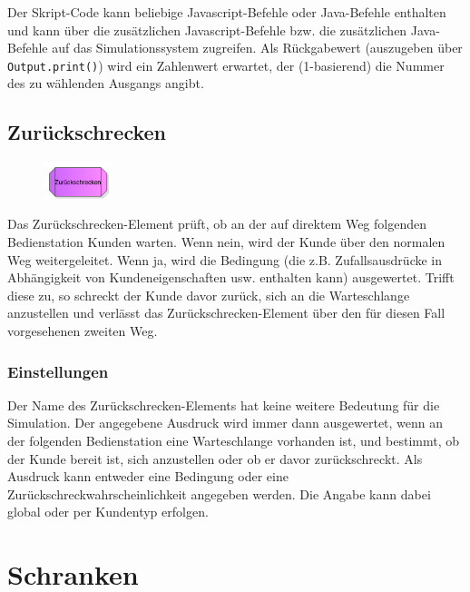 Der Skript-Code kann beliebige Javascript-Befehle oder Java-Befehle enthalten
und kann über die zusätzlichen Javascript-Befehle bzw.
die zusätzlichen Java-Befehle auf das Simulationssystem
zugreifen. Als Rückgabewert (auszugeben über \texttt{Output.print()}) wird ein Zahlenwert
erwartet, der (1-basierend) die Nummer des zu wählenden Ausgangs angibt.


\section{Zurückschrecken}
\label{ref:ModelElementBalking}

\begin{figure}
\vspace{-22pt}
\includegraphics[width=2cm]{imageModelElementBalking.png}
\vspace{-22pt}
\end{figure}

Das Zurückschrecken-Element prüft, ob an der auf direktem Weg folgenden Bedienstation Kunden warten.
Wenn nein, wird der Kunde über den normalen Weg weitergeleitet.
Wenn ja, wird die Bedingung (die z.B. Zufallsausdrücke in Abhängigkeit von Kundeneigenschaften usw.
enthalten kann) ausgewertet. Trifft diese zu, so schreckt der Kunde davor zurück, sich an die
Warteschlange anzustellen und verlässt das Zurückschrecken-Element über den für diesen Fall
vorgesehenen zweiten Weg.

\subsection*{Einstellungen}

Der Name des Zurückschrecken-Elements hat keine weitere Bedeutung für die Simulation.
Der angegebene Ausdruck wird immer dann ausgewertet, wenn an der folgenden Bedienstation
eine Warteschlange vorhanden ist, und bestimmt, ob der Kunde bereit ist, sich anzustellen
oder ob er davor zurückschreckt. Als Ausdruck kann entweder eine Bedingung oder eine
Zurückschreckwahrscheinlichkeit angegeben werden. Die Angabe kann dabei global oder per
Kundentyp erfolgen.





\chapter{Schranken}


